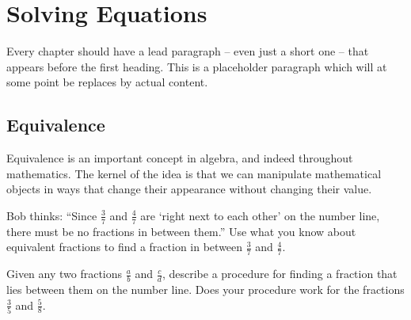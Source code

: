 \chapter{Solving Equations}
\label{ch:equations}



Every chapter should have a lead paragraph -- even just a short one -- that appears before the first heading. This is a placeholder paragraph which will at some point be replaces by actual content.

\section{Equivalence}
\label{sec:equivalence}

Equivalence is an important concept in algebra, and indeed throughout mathematics. The kernel of the idea is that we can manipulate mathematical objects in ways that change their appearance without changing their value.

\begin{boxedexplore}
Bob thinks: ``Since $\frac{3}{7}$ and $\frac{4}{7}$ are `right next to each other' on the number line, there must be no fractions in between them.'' Use what you know about equivalent fractions to find a fraction in between $\frac{3}{7}$ and $\frac{4}{7}$.

Given any two fractions $\frac{a}{b}$ and $\frac{c}{d}$, describe a procedure for finding a fraction that lies between them on the number line. Does your procedure work for the fractions $\frac{3}{5}$ and $\frac{5}{8}$.
\end{boxedexplore} %


